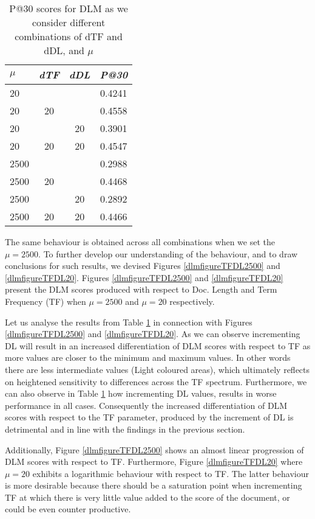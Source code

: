 \begin{table}[]
	\caption{P@30 scores for DLM as we consider different combinations of dTF and dDL, and $\mu$}
	\centering
	\begin{tabular}{l|c|c|c} 	
	\textit{\textbf{$\mu$}} & 
	\textit{\textbf{dTF}} & 
	\textit{\textbf{dDL}} & 
	\textit{\textbf{P@30}} 	
	\tabularnewline
	\hline
	20 &    &    & 0.4241\\
	20 & 20 &    & 0.4558\\
	20 &    & 20 & 0.3901\\
	20 & 20 & 20 & 0.4547\\
	\hline	
	\hline
	2500 &    &    & 0.2988\\
	2500 & 20 &    & 0.4468\\
	2500 &    & 20 & 0.2892\\
	2500 & 20 & 20 & 0.4466\\
    \hline
	\end{tabular}
	\label{drmdtfmuvalues}
\end{table}

The same behaviour is obtained across all combinations when we set the $\mu = 2500$. To further develop our understanding of the behaviour, and to draw conclusions for such results, we devised Figures \ref{dlmfigureTFDL2500} and \ref{dlmfigureTFDL20}. Figures \ref{dlmfigureTFDL2500} and \ref{dlmfigureTFDL20} present the DLM scores produced with respect to Doc. Length and Term Frequency (TF) when $\mu=2500$ and $\mu=20$ respectively.

Let us analyse the results from Table \ref{drmdtfmuvalues} in connection with Figures \ref{dlmfigureTFDL2500} and \ref{dlmfigureTFDL20}. As we can observe incrementing DL will result in an increased differentiation of DLM scores with respect to TF as more values are closer to the minimum and maximum values. In other words there are less intermediate values (Light coloured areas), which ultimately reflects on heightened sensitivity to differences across the TF spectrum. Furthermore, we can also observe in Table \ref{drmdtfmuvalues} how incrementing DL values, results in worse performance in all cases. Consequently the increased differentiation of DLM scores with respect to the TF parameter, produced by the increment of DL is detrimental and in line with the findings in the previous section.

Additionally, Figure \ref{dlmfigureTFDL2500} shows an almost linear progression of DLM scores with respect to TF. Furthermore, Figure \ref{dlmfigureTFDL20} where $\mu=20$ exhibits a logarithmic behaviour with respect to TF. The latter behaviour is more desirable because there should be a saturation point when incrementing TF at which there is very little value added to the score of the document, or could be even counter productive.

